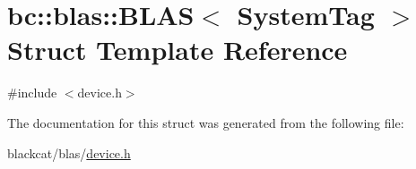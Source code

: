 \hypertarget{structbc_1_1blas_1_1BLAS}{}\section{bc\+:\+:blas\+:\+:B\+L\+AS$<$ System\+Tag $>$ Struct Template Reference}
\label{structbc_1_1blas_1_1BLAS}


{\ttfamily \#include $<$device.\+h$>$}



The documentation for this struct was generated from the following file\+:\begin{DoxyCompactItemize}
\item 
blackcat/blas/\hyperlink{blas_2device_8h}{device.\+h}\end{DoxyCompactItemize}
